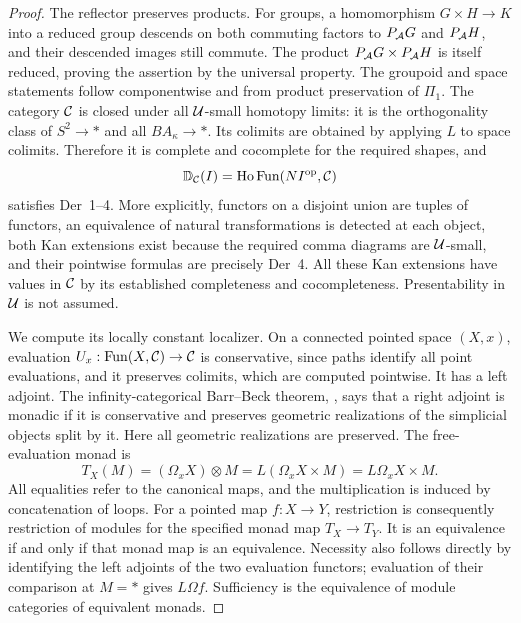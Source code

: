 \begin{proof}
The reflector preserves products. For groups, a homomorphism $G\times H\to K$ into a reduced group descends on both commuting factors to $P_{\mathcal A} G$ and $P_{\mathcal A} H$, and their descended images still commute. The product $P_{\mathcal A} G\times P_{\mathcal A} H$ is itself reduced, proving the assertion by the universal property. The groupoid and space statements follow componentwise and from product preservation of $\Pi_1$. The category $\mathcal C$ is closed under all $\mathcal U$-small homotopy limits: it is the orthogonality class of $S^2\to*$ and all $BA_\kappa\to*$. Its colimits are obtained by applying $L$ to space colimits. Therefore it is complete and cocomplete for the required shapes, and
\[
 \mathbb D_{\mathcal C}(I)=\operatorname{Ho}\operatorname{Fun}(NI^{\mathrm{op}},\mathcal C)
\]
satisfies Der~1--4. More explicitly, functors on a disjoint union are tuples of functors, an equivalence of natural transformations is detected at each object, both Kan extensions exist because the required comma diagrams are $\mathcal U$-small, and their pointwise formulas are precisely Der~4. All these Kan extensions have values in $\mathcal C$ by its established completeness and cocompleteness. Presentability in $\mathcal U$ is not assumed.

We compute its locally constant localizer. On a connected pointed space $(X,x)$, evaluation $U_x:\operatorname{Fun}(X,\mathcal C)\to\mathcal C$ is conservative, since paths identify all point evaluations, and it preserves colimits, which are computed pointwise. It has a left adjoint. The infinity-categorical Barr--Beck theorem, \cite[Theorem 4.7.3.5]{FGHLurieHA}, says that a right adjoint is monadic if it is conservative and preserves geometric realizations of the simplicial objects split by it. Here all geometric realizations are preserved. The free-evaluation monad is
\[
 T_X(M)=(\Omega_xX)\otimes M
        =L(\Omega_xX\times M)
        =L\Omega_xX\times M.
\]
All equalities refer to the canonical maps, and the multiplication is induced by concatenation of loops. For a pointed map $f:X\to Y$, restriction is consequently restriction of modules for the specified monad map $T_X\to T_Y$. It is an equivalence if and only if that monad map is an equivalence. Necessity also follows directly by identifying the left adjoints of the two evaluation functors; evaluation of their comparison at $M=*$ gives $L\Omega f$. Sufficiency is the equivalence of module categories of equivalent monads.


\end{proof}
